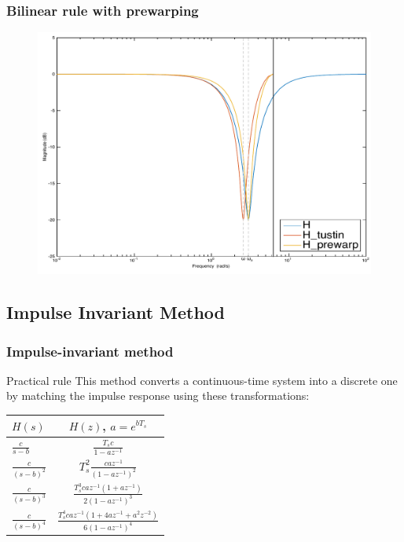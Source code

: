 \begin{frame}
	\frametitle{Bilinear rule with prewarping}
	\vspace{-0.5em}
	\begin{figure}
		\centering
		\includegraphics[width=0.8\linewidth]{Distortion_bode1}
	\end{figure}
\end{frame}

\subsection{Impulse Invariant Method}

\begin{frame}
	\frametitle{Impulse-invariant method}
	\begin{block}{Practical rule}
		This method converts a continuous-time system into a discrete one by matching the impulse response using these transformations:
		\begin{center} 
			\begin{tabular}{ | l | c |} 
			\hline $H(s)$ & $H(z)$, $a = e^{bT_s}$\\ 
			\hline $\frac{c}{s - b}$ & $\frac{T_sc}{1 - az^{-1}}$\\ 
			\hline $\frac{c}{(s - b)^2}$ & $T_s^2 \frac{caz^{-1}}{(1 - az^{-1})^2}$ \\
			\hline $\frac{c}{(s - b)^3}$ & $\frac{T_s^3 caz^{-1}(1 + az^{-1})}{2(1 - az^{-1})^3}$ \\
			\hline $\frac{c}{(s - b)^4}$ & $\frac{T_s^4 caz^{-1}(1 + 4az^{-1} + a^2z^{-2})}{6(1 - az^{-1})^4}$ \\
			\hline 
			\end{tabular}
		\end{center}
	\end{block}
\end{frame}

